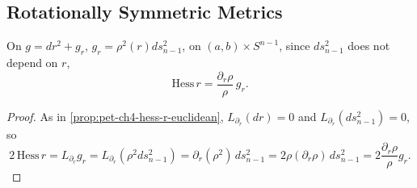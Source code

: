 \subsection{Rotationally Symmetric Metrics}

\begin{proposition}
  \label{prop:pet-ch4-hess-r-rotsym}
  On $g=dr^2+g_r$, $g_r=\rho^2(r)ds_{n-1}^2$, on $(a,b)\times S^{n-1}$, since
  $ds_{n-1}^2$ does not depend on $r$,
  \[
    \mathrm{Hess}\,r=\frac{\partial_r\rho}{\rho}\,g_r.
  \]
\end{proposition}
\begin{proof}
  As in \cref{prop:pet-ch4-hess-r-euclidean}, $L_{\partial_r}(dr)=0$ and
  $L_{\partial_r}(ds_{n-1}^2)=0$, so
  \[
    2\,\mathrm{Hess}\,r=L_{\partial_r}g_r=L_{\partial_r}(\rho^2ds_{n-1}^2)
    =\partial_r(\rho^2)\,ds_{n-1}^2=2\rho(\partial_r\rho)\,ds_{n-1}^2
    =2\frac{\partial_r\rho}{\rho}g_r.
  \]
\end{proof}

